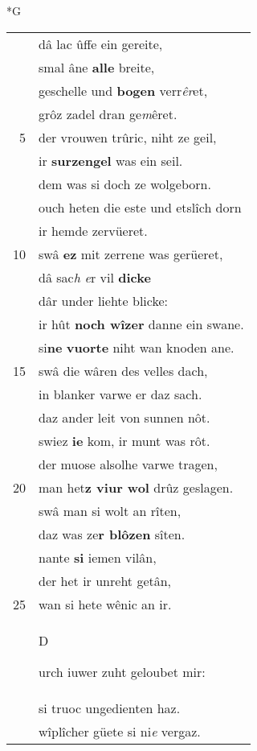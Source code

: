 \documentclass[8pt,a4paper,notitlepage]{article}
\begin{document}
\begin{table}[ht]
\begin{minipage}[t]{0.5\linewidth}
\small
\begin{center}*G
\end{center}
\begin{tabular}{rl}
 & dâ lac ûffe ein gereite,\\ 
 & smal âne \textbf{alle} breite,\\ 
 & geschelle und \textbf{bogen} verr\textit{êr}et,\\ 
 & grôz zadel dran ge\textit{m}êret.\\ 
5 & der vrouwen trûric, niht ze geil,\\ 
 & ir \textbf{surzengel} was ein seil.\\ 
 & dem was si doch ze wolgeborn.\\ 
 & ouch heten die este und etslîch dorn\\ 
 & ir hemde zervüeret.\\ 
10 & swâ \textbf{ez} mit zerrene was gerüeret,\\ 
 & dâ sac\textit{h e}r vil \textbf{dicke}\\ 
 & dâr under liehte blicke:\\ 
 & ir hût \textbf{noch wîzer} danne ein swane.\\ 
 & si\textbf{ne} \textbf{vuorte} niht wan knoden ane.\\ 
15 & swâ die wâren des velles dach,\\ 
 & in blanker varwe er daz sach.\\ 
 & daz ander leit von sunnen nôt.\\ 
 & swiez \textbf{ie} kom, ir munt was rôt.\\ 
 & der muose alsolhe varwe tragen,\\ 
20 & man het\textbf{z viur wol} drûz geslagen.\\ 
 & swâ man si wolt an rîten,\\ 
 & daz was ze\textbf{r blôzen} sîten.\\ 
 & nante \textbf{si} iemen vilân,\\ 
 & der het ir unreht getân,\\ 
25 & wan si hete wênic an ir.\\ 
 & \begin{large}D\end{large}urch iuwer zuht geloubet mir:\\ 
 & si truoc ungedienten haz.\\ 
 & wîplîcher güete si ni\textit{e} vergaz.\\ 

\end{tabular}
\end{minipage}
\end{table}
\end{document}
